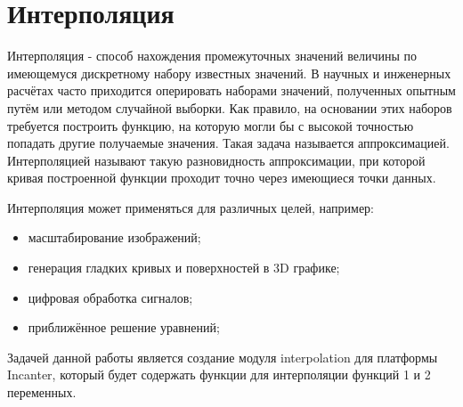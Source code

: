 \section{Интерполяция}

Интерполяция - способ нахождения промежуточных значений величины по имеющемуся дискретному набору известных значений. В научных и инженерных расчётах часто приходится оперировать наборами значений, полученных опытным путём или методом случайной выборки. Как правило, на основании этих наборов требуется построить функцию, на которую могли бы с высокой точностью попадать другие получаемые значения. Такая задача называется аппроксимацией. Интерполяцией называют такую разновидность аппроксимации, при которой кривая построенной функции проходит точно через имеющиеся точки данных.

Интерполяция может применяться для различных целей, например:

\begin{itemize}
\item масштабирование изображений;

\item генерация гладких кривых и поверхностей в 3D графике;

\item цифровая обработка сигналов;

\item приближённое решение уравнений;
\end{itemize}

Задачей данной работы является создание модуля interpolation для платформы Incanter, который будет содержать функции для интерполяции функций 1 и 2 переменных.

